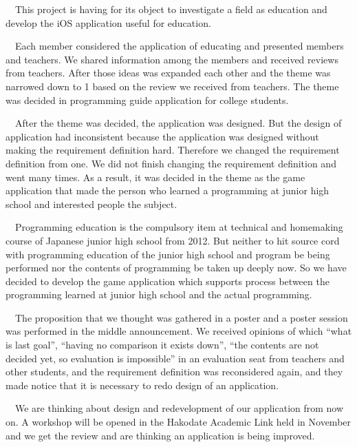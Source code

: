 \documentclass[openany,11pt,papersize]{jsbook}
\newcounter{hoge}
\newcommand{\fake}[1]{\whiledo{\thehoge<70}{#1\stepcounter{hoge}}%
  \setcounter{hoge}{0}}
\begin{document}
\begin{eabstract} 
　This project is having for its object to investigate a field as education and develop the iOS application useful for education.

　Each member considered the application of educating and presented members and teachers. We shared information among the members and received reviews from teachers. After those ideas was expanded each other and the theme was narrowed down to 1 based on the review we received from teachers. The theme was decided in programming guide application for college students.

　After the theme was decided, the application was designed. But the design of application had inconsistent because the application was designed without making the requirement definition hard. Therefore we changed the requirement definition from one. We did not finish changing the requirement definition and went many times. As a result, it was decided in the theme as the game application that made the person who learned a programming at junior high school and interested people the subject.

　Programming education is the compulsory item at technical and homemaking course of Japanese junior high school from 2012. But neither to hit source cord with programming education of the junior high school and program be being performed nor the contents of programming be taken up deeply now. So we have decided to develop the game application which supports process between the programming learned at junior high school and the actual programming.

　The proposition that we thought was gathered in a poster and a poster session was performed in the middle announcement. We received opinions of which ``what is last goal'', ``having no comparison it exists down'', ``the contents are not decided yet, so evaluation is impossible'' in an evaluation seat from teachers and other students, and the requirement definition was reconsidered again, and they made notice that it is necessary to redo design of an application.

　We are thinking about design and redevelopment of our application from now on. A workshop will be opened in the Hakodate Academic Link held in November and we get the review and are thinking an application is being improved. 
\end{eabstract}
\end{document}
